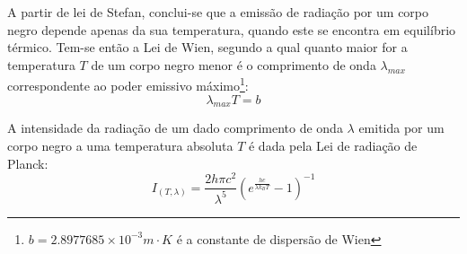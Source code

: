\documentclass[9pt]{extarticle}
\newcommand{\PC}[1]{\ensuremath{\left(#1\right)}}
\begin{document}
\begin{multicols}{2}
\par A partir de lei de Stefan, conclui-se que a emissão de radiação por um corpo negro depende apenas da sua temperatura, quando este se encontra em equilíbrio térmico. Tem-se então a Lei de Wien, segundo a qual quanto maior for a temperatura $T$ de um corpo negro menor é o comprimento de onda $\lambda_{max}$ correspondente ao poder emissivo máximo\footnote{$b=2.8977685\times10^{-3}m\cdot K$ é a constante de dispersão de Wien}:
\begin{equation} \label{wien}
\lambda_{max} T = b
\end{equation}

\par A intensidade da radiação de um dado comprimento de onda $\lambda$ emitida por um corpo negro a uma temperatura absoluta $T$ é dada pela Lei de radiação de Planck:
\begin{equation} \label{planck}
I_{(T,\lambda)} = \frac{2h\pi c^2}{\lambda^5} \PC{e^{\frac{hc}{\lambda k_B T}}-1}^{-1}
\end{equation}
\begin{center}
\par{}
\end{center}





\end{multicols}
\end{document}
